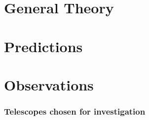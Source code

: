 \documentclass[a4paper]{article}%
\numberwithin{equation}{section}%
\renewcommand{\=}[1]{\stackrel{#1}{=}}%
\begin{document}

\newpage
\tableofcontents
{}
\listoffigures
\listoftables
\newpage

\pagestyle{headings}
    
\newpage

\part{General Theory} %
\label{prt:general_theory}
    
    

\newpage
\part{Predictions} %
\label{prt:predictions}
    
    
    
    

    
    
\newpage
\part{Observations} %
\label{prt:observations}
    
    

    
        
        
        
        

    

    \section{Telescopes chosen for investigation} %
    \label{sec:telescopes_chosen_for_investigation}
        
        
        
        
        

    
    

\newpage


\newpage
\appendix
    
    
\end{document}
